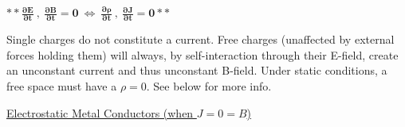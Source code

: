 \documentclass[12pt]{article}
\begin{document}
\begin{landscape}
\vspace{20pt}
\( \boldsymbol{ ** \boxed{ 
	\tfrac{\partial E}{\partial t} \ , \ \tfrac{\partial B}{\partial t} = 0
	\ \Leftrightarrow \ 
	\tfrac{\partial \rho}{\partial t} \ , \ \tfrac{\partial J}{\partial t} = 0
} } ** \)
\hspace{20pt}
\parbox{.35\textwidth}{\scriptsize 
	Single charges do not constitute a current. Free charges (unaffected by external forces holding them) %
	will always, by self-interaction through their E-field, create an unconstant current and thus unconstant B-field. %
	Under static conditions, a free space must have a \(\rho = 0\). See below for more info. %
}

\vspace{25pt}
\underline{Electrostatic Metal Conductors (when \(J = 0 = B\))}


\end{landscape}
\end{document}
